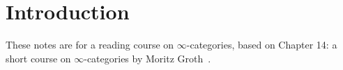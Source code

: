 \chapter{Introduction}

These notes are for a reading course on \(\infty\)-categories, based on Chapter 14: a short course on \(\infty\)-categories by Moritz Groth~\cite{friedlanderHandbookKtheory2005}.  